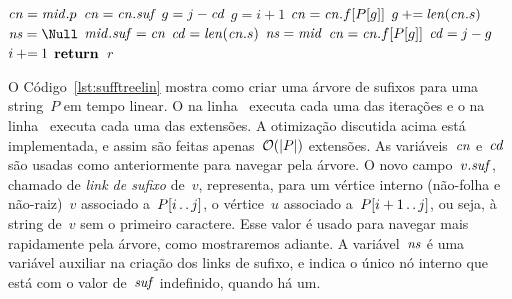 \begin{algorithm}
\begin{algorithmic}[1]
                \EndIf
%
                \State $\mathit{cn} = \mathit{mid}.p$ \label{lst:stl:buscas} \label{lst:stl:cn3}
                    \State $\mathit{cn} = \mathit{cn}.\mathit{suf}$ \label{lst:stl:cn4}
                    \State $g = j - \mathit{cd}$ \label{lst:stl:g1}
                \Else {}
                    \State $g = i + 1$ \label{lst:stl:cninite} \label{lst:stl:g2}
                \EndIf 
                 \label{lst:stl:whileauxs}
                    \State $\mathit{cn} = \mathit{cn}.f[P[g]]$ \label{lst:stl:edge} \label{lst:stl:cn5}
                    \State $g \mathbin{{\tiny +}{=}} \mathit{len}(\mathit{cn}.s)$ \label{lst:stl:whileauxe} \label{lst:stl:g3}
                \EndWhile
                    \State $\ns = \Null$ \label{lst:stl:midsufs}
                    \State $\mathit{mid}.\mathit{suf} = \mathit{cn}$ \label{lst:stl:midsufe}
                    \State $\mathit{cd} = \mathit{len}(\mathit{cn}.s)$
                \Else
                    \State $\mathit{ns} = \mathit{mid}$ \label{lst:stl:midns}
                    \State $\mathit{cn} = \mathit{cn}.f[P[g]]$ \label{lst:stl:cncds} \label{lst:stl:cn6}
                    \State $\mathit{cd} = j - g$  \label{lst:stl:caso3e}
                \EndIf
            \EndIf
            \State $i \mathbin{{\tiny +}{=}} 1$
        \EndWhile
    \EndFor
    \State $\Return$~$r$
\EndFunction
\end{algorithmic}
\end{algorithm}


O Código~\ref{lst:sufftreelin} mostra como criar uma árvore de sufixos para uma string~$P$ em tempo linear. O  na linha~ executa cada uma das iterações e o  na linha~ executa cada uma das extensões. A otimização discutida acima está implementada, e assim são feitas apenas~$\mathcal{O}(|P|)$ extensões.
As variáveis~$\mathit{cn}$ e~$\mathit{cd}$ são usadas como anteriormente para navegar pela árvore. O novo campo~$v.\mathit{suf}$, chamado de \emph{link de sufixo} de~$v$, representa, para um vértice interno (não-folha e não-raiz)~$v$ associado a~$P[i\,.\,.\, j]$, o vértice~$u$ associado a~$P[i+1\,.\,.\, j]$, ou seja, à string de~$v$ sem o primeiro caractere.
Esse valor é usado para navegar mais rapidamente pela árvore, como mostraremos adiante. A variável~$\mathit{ns}$ é uma variável auxiliar na criação dos links de sufixo, e indica o único nó interno que está com o valor de~$\mathit{suf}$ indefinido, quando há um.

